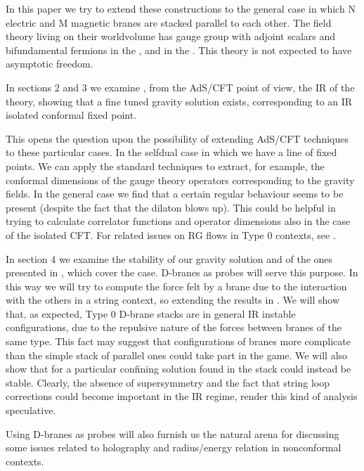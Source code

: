 \documentclass[a4paper,12pt]{article}
\begin{document}
In this paper we try to extend these constructions to the  general case in which
N electric and M magnetic branes are stacked parallel to each other. The field theory living on their worldvolume has gauge group \coordHE{} with adjoint scalars and 
bifundamental fermions in the \coordHE{}, and in the \coordHE{}.
This theory is not expected to have asymptotic freedom.

In sections 2 and 3  we examine , from the AdS/CFT point of view, the IR of the theory, showing that a fine tuned gravity solution exists, corresponding to an IR isolated conformal fixed point.
 
This opens the question upon the possibility of extending AdS/CFT 
techniques to these particular cases. In the selfdual case in which \coordHE{} 
we have a line of fixed points. We can apply the standard techniques to extract,
for example, the conformal dimensions of the gauge theory operators 
corresponding to the gravity fields. In the general case we find that
a certain regular behaviour seems to be present (despite the fact that the
 dilaton blows up). This could be helpful in trying to calculate correlator
functions and operator dimensions also in the case of the isolated CFT. For related
issues on RG flows in Type 0 contexts, see \cite{angel}.

In section 4 we examine the stability of our gravity solution and of the ones presented in \cite{kt0},\cite{minahan} which cover the \coordHE{} case.  
D-branes as probes will serve this purpose. In this way we will try to compute
the force felt by a brane due to the interaction with the others in a string context, so extending the results in \cite{tz}. We will show that, as expected,
 Type 0 D-brane stacks are in general IR instable configurations, due to the repulsive nature of the forces between branes of the same type. This fact may suggest that configurations of branes more complicate than the simple stack of parallel ones could take part in the game. We will also show that for a particular confining solution found in \cite{minahan} the stack could instead be stable.
Clearly, the absence of supersymmetry and the fact that string loop corrections 
could become important in the IR regime, render this kind of analysis
speculative.

Using D-branes as probes will also furnish us the natural arena for discussing some issues related to holography and radius/energy relation in nonconformal contexts.
\end{document}
